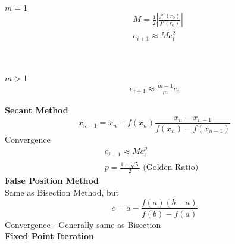 \documentclass[10pt]{article}
\begin{document}
\begin{multicols}{2}
\begin{minipage}{\columnwidth}
\begin{flushright}
\begin{multicols}{2}
                \begin{minipage}{1in}
                    \(m = 1\)
                    \begin{equation*}
                        \begin{aligned}
                            & M = \frac{1}{2} \left| \frac{f''(r_0)}{f'(r_0)} \right|  \\
                            & e_{i+1} \approx Me_i^2 \\
                        \end{aligned}
                    \end{equation*}
                \end{minipage} \\                
                \begin{minipage}{1in}                    
                    \(m > 1\)
                    \begin{equation*}
                        \begin{aligned}
                            e_{i+1} \approx \frac{m-1}{m} e_i
                        \end{aligned}
                    \end{equation*}
                \end{minipage}
            \end{multicols}
            \textbf{Secant Method}
            \begin{equation*}
                x_{n+1} = x_n - f(x_n)\frac{x_n - x_{n-1}}{f(x_n) - f(x_{n-1})}
            \end{equation*}
            Convergence
            \begin{equation*}
                \begin{aligned}
                    e_{i+1} \approx Me_i^p & \\
                    p = \frac{1 + \sqrt{5}}{2} \text{ (Golden Ratio)} &
                \end{aligned}
            \end{equation*}
            \textbf{False Position Method} \\
            Same as Bisection Method, but 
            \begin{equation*}
                c = a - \frac{f(a) (b-a)}{f(b) - f(a)}
            \end{equation*}
            Convergence - Generally same as Bisection \\
            \textbf{Fixed Point Iteration}
            \begin{enumerate}

\end{enumerate}
\end{flushright}
\end{minipage}
\end{multicols}
\end{document}
